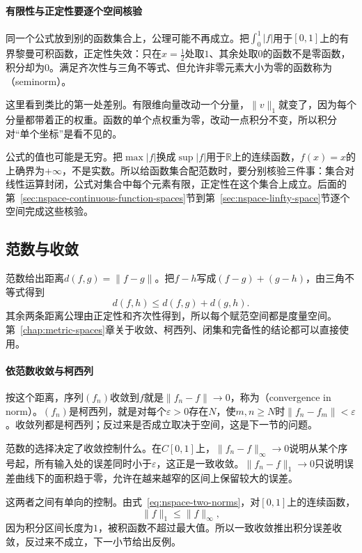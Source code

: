 \paragraph{有限性与正定性要逐个空间核验}
同一个公式放到别的函数集合上，公理可能不再成立。把$\int_0^1\lvert f\rvert$用于$[0,1]$上的有界黎曼可积函数，正定性失效：只在$x=\tfrac12$处取$1$、其余处取$0$的函数不是零函数，积分却为$0$。满足齐次性与三角不等式、但允许非零元素大小为零的函数称为（seminorm）。

这里看到类比的第一处差别。有限维向量改动一个分量，$\lVert v\rVert_1$就变了，因为每个分量都带着正的权重。函数的单个点权重为零，改动一点积分不变，所以积分对“单个坐标”是看不见的。

公式的值也可能是无穷。把$\max\lvert f\rvert$换成$\sup\lvert f\rvert$用于$\mathbb R$上的连续函数，$f(x)=x$的上确界为$+\infty$，不是实数。所以给函数集合配范数时，要分别核验三件事：集合对线性运算封闭，公式对集合中每个元素有限，正定性在这个集合上成立。后面的第~\ref{sec:nspace-continuous-function-spaces}节到第~\ref{sec:nspace-linfty-space}节逐个空间完成这些核验。

\subsection{范数与收敛}
\label{sec:nspace-norm-convergence}

范数给出距离$d(f,g)=\lVert f-g\rVert$。把$f-h$写成$(f-g)+(g-h)$，由三角不等式得到
\[
 d(f,h)\leq d(f,g)+d(g,h).
\]
其余两条距离公理由正定性和齐次性得到，所以每个赋范空间都是度量空间。第~\ref{chap:metric-spaces}章关于收敛、柯西列、闭集和完备性的结论都可以直接使用。

\paragraph{依范数收敛与柯西列}
按这个距离，序列$(f_n)$收敛到$f$就是$\lVert f_n-f\rVert\to0$，称为（convergence in norm）。$(f_n)$是柯西列，就是对每个$\varepsilon>0$存在$N$，使$m,n\geq N$时$\lVert f_n-f_m\rVert<\varepsilon$。收敛列都是柯西列；反过来是否成立取决于空间，这是下一节的问题。

范数的选择决定了收敛控制什么。在$C[0,1]$上，$\lVert f_n-f\rVert_\infty\to0$说明从某个序号起，所有输入处的误差同时小于$\varepsilon$，这正是一致收敛。$\lVert f_n-f\rVert_1\to0$只说明误差曲线下的面积趋于零，允许在越来越窄的区间上保留较大的误差。

这两者之间有单向的控制。由式~\eqref{eq:nspace-two-norms}，对$[0,1]$上的连续函数，
\begin{equation}
 \lVert f\rVert_1\leq\lVert f\rVert_\infty,
 \label{eq:nspace-sup-controls-l1}
\end{equation}
因为积分区间长度为$1$，被积函数不超过最大值。所以一致收敛推出积分误差收敛，反过来不成立，下一小节给出反例。

